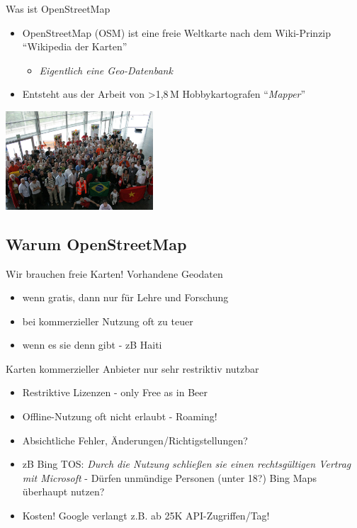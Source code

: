 \documentclass{beamer}
\begin{document}
\begin{frame}{Was ist OpenStreetMap}

\begin{itemize}
  \item OpenStreetMap (OSM) ist eine freie Weltkarte nach dem Wiki-Prinzip "`Wikipedia der Karten"'
    \begin{itemize}
      \item \emph{Eigentlich eine Geo-Datenbank}
    \end{itemize}
\pause
  \item Entsteht aus der Arbeit von \textgreater 1,8\,M Hobbykartografen "`\emph{Mapper}"'

\end{itemize}


 \begin{center}
 \includegraphics[width=5.5cm]{sotm.jpg}
 \end{center}

\end{frame}

\subsection{Warum OpenStreetMap}

\begin{frame}{Wir brauchen freie Karten!}
Vorhandene Geodaten
\begin{itemize}
  \item wenn gratis, dann nur für Lehre und Forschung
  \item bei kommerzieller Nutzung oft zu teuer
  \item wenn es sie denn gibt - zB Haiti
\end{itemize}

\pause
\vspace{2mm}
Karten kommerzieller Anbieter nur sehr restriktiv nutzbar
\begin{itemize}
  \item Restriktive Lizenzen - only Free as in Beer
  \item Offline-Nutzung oft nicht erlaubt - Roaming!
  \item Absichtliche Fehler, Änderungen/Richtigstellungen?
  \pause
  \item zB Bing TOS: \emph{Durch die Nutzung schließen sie einen rechtsgültigen Vertrag mit Microsoft} - Dürfen unmündige Personen (unter 18?) Bing Maps überhaupt nutzen?
  \item Kosten! Google verlangt z.B. ab 25K API-Zugriffen/Tag!
\end{itemize}

\end{frame}
\end{document}
